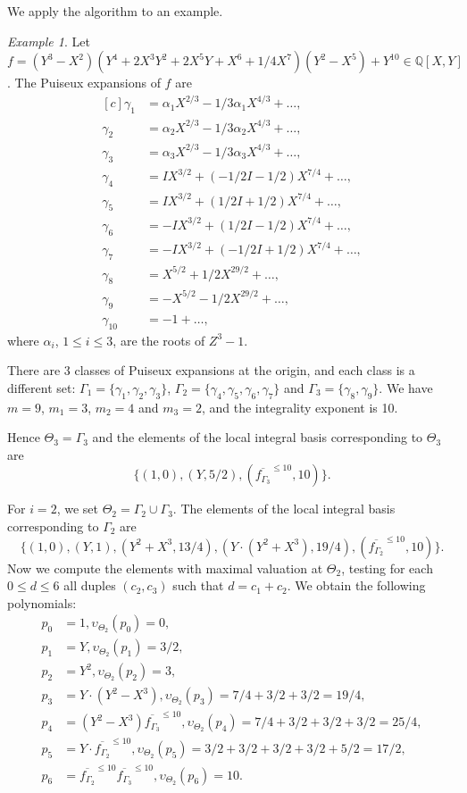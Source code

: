 \documentclass[a4paper,11pt]{amsart}%
\theoremstyle{definition}
\theoremstyle{plain}
\theoremstyle{remark}
\newtheorem{example}[defn]{Example}
\begin{document}
We apply the algorithm to an example.

\begin{example}
Let $f = (Y^3-X^2)(Y^4 + 2X^3Y^2 + 2X^5Y + X^6 + 1/4X^7)(Y^2-X^5) + Y^{10} \in{\mathbb{Q}}[X,Y]$.
The Puiseux expansions of $f$ are
$$
\begin{aligned}[c]
\gamma_{1} &=\alpha_1 X^{2/3} - 1/3 \alpha_1 X^{4/3} + \dots,\\
\gamma_{2} &=\alpha_2 X^{2/3} - 1/3 \alpha_2 X^{4/3} + \dots,\\
\gamma_{3} &=\alpha_3 X^{2/3} - 1/3 \alpha_3 X^{4/3} + \dots,\\
\gamma_{4} &=IX^{3/2} +(-1/2I-1/2)X^{7/4} + \dots,\\
\gamma_{5} &=IX^{3/2} +(1/2I+1/2)X^{7/4} + \dots,\\
\gamma_{6} &=-IX^{3/2}+(1/2I-1/2)X^{7/4} + \dots,\\
\gamma_{7} &=-IX^{3/2}+(-1/2I+1/2)X^{7/4} + \dots,\\
\gamma_{8} &=X^{5/2}+ 1/2  X^{29/2} + \dots,\\
\gamma_{9} &=-X^{5/2} - 1/2  X^{29/2} +  \dots,\\
\gamma_{10} &=-1 + \dots,
\end{aligned}
$$
where $\alpha_{i}$, $1 \le i \le 3$, are the roots of $Z^{3}-1$.

There are 3 classes of Puiseux expansions at the origin, and each class is a different set: $\Gamma_1 = \{\gamma_1, \gamma_2, \gamma_3\}$, $\Gamma_2 = \{\gamma_4, \gamma_5, \gamma_6, \gamma_7\}$ and $\Gamma_3 = \{\gamma_8, \gamma_9\}$. We have $m=9$, $m_{1} = 3$, $m_2 = 4$  and $m_{3} = 2$, and the integrality exponent is 10.

Hence $\Theta_{3} = \Gamma_{3}$ and
the elements of the local integral basis corresponding to $\Theta_{3}$ are
$$\{(1, 0), (Y, 5/2), (\overline{f_{\Gamma_3}}^{\le 10}, 10)\}.$$

For $i = 2$, we set $\Theta_{2} = \Gamma_2 \cup \Gamma_3$. The
elements of the local integral basis corresponding to $\Gamma_{2}$ are
$$\{(1, 0), (Y,
1), (Y^2+X^3, 13/4), (Y\cdot(Y^2 + X^3), 19/4), (\overline{f_{\Gamma_2}}^{\le 10}, 10)\}.$$
Now we compute the elements with maximal valuation at $\Theta_2$, testing for each $0 \le d \le 6$ all duples $(c_2, c_3)$ such that $d = c_1 + c_2$. We obtain the following polynomials:
$$
\begin{aligned}
p_0 &= 1, \upsilon_{\Theta_2}(p_0) = 0, \\
p_1 &= Y, \upsilon_{\Theta_2}(p_1) = 3/2, \\
p_2 &= Y^2, \upsilon_{\Theta_2}(p_2) = 3, \\
p_3 &= Y\cdot(Y^2-X^3), \upsilon_{\Theta_2}(p_3) = 7/4+3/2+3/2 = 19/4, \\
p_4 &= (Y^2-X^3)\overline{f_{\Gamma_3}}^{\le 10}, \upsilon_{\Theta_2}(p_4) = 7/4+3/2+3/2+3/2 = 25/4,\\
p_5 &= Y\cdot\overline{f_{\Gamma_2}}^{\le 10}, \upsilon_{\Theta_2}(p_5) = 3/2+3/2+3/2+3/2+5/2 = 17/2, \\
p_6 &= \overline{f_{\Gamma_2}}^{\le 10}\overline{f_{\Gamma_3}}^{\le 10}, \upsilon_{\Theta_2}(p_6) = 10.
\end{aligned}
$$


\end{example}
\end{document}
